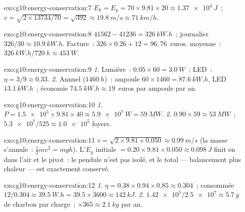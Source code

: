 \begin{solution}{exo:g10:energy-conservation:7}
$E_k = E_p = 70 \times 9.81 \times 20 \approx \qty{1.37e4}{J}$~;
$v = \sqrt{2 \times 13734/70} = \sqrt{392} \approx \qty{19.8}{m/s}
\approx \qty{71}{km/h}$.
\end{solution}

\begin{solution}{exo:g10:energy-conservation:8}
$41562 - 41236 = \qty{326}{kW.h}$~; journalier $326/30 \approx
\qty{10.9}{kW.h}$. Facture~: $326 \times 0.26 + 12 = 96{,}76$~euros.
 moyenne~: $\qty{326}{kW.h}/\qty{720}{h} \approx
\qty{453}{W}$.
\end{solution}

\begin{solution}{exo:g10:energy-conservation:9}
\emph{1.} Lumière~: $0.05 \times 60 = \qty{3.0}{W}$~; LED~:
$\eta = 3/9 \approx 0.33$.
\emph{2.} Annuel ($\qty{1460}{h}$)~: ampoule
$60 \times 1460 = \qty{87.6}{kW.h}$, LED $\qty{13.1}{kW.h}$~;
économie $\qty{74.5}{kW.h} \approx 19$~euros par ampoule par an.
\end{solution}

\begin{solution}{exo:g10:energy-conservation:10}
\emph{1.} $P = \num{1.5e5} \times 9.81 \times 40 \approx
\qty{5.9e7}{W} = \qty{59}{MW}$.
\emph{2.} $0.90 \times 59 \approx \qty{53}{MW}$~;
$\num{5.3e7}/525 \approx \num{1.0e5}$ foyers.
\end{solution}

\begin{solution}{exo:g10:energy-conservation:11}
$v = \sqrt{2 \times 9.81 \times 0.050} \approx \qty{0.99}{m/s}$
(la masse s'annule~: $\tfrac12 m v^2 = mgh$). L'$E_p$ initiale
$= 0.20 \times 9.81 \times 0.050 \approx \qty{0.098}{J}$ finit en
 dans l'air et le pivot~: le pendule n'est
pas isolé, et le total --- balancement plus chaleur --- est
exactement conservé.
\end{solution}

\begin{solution}{exo:g10:energy-conservation:12}
\emph{1.} $\eta = 0.38 \times 0.94 \times 0.85 \approx 0.304$~;
consommée $12/0.304 \approx \qty{39.5}{W.h}
= 39.5 \times 3600 \approx \qty{142}{kJ}$.
\emph{2.} $\num{1.42e5}/\num{2.5e7} \approx \qty{5.7}{g}$ de charbon
par charge~; $\times 365 \approx \qty{2.1}{kg}$ par an.
\end{solution}

